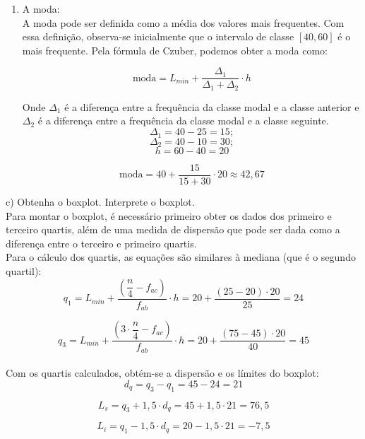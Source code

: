 \begin{enumerate}[i]
    \item A moda:
          \\

          A moda pode ser definida como a média dos valores mais frequentes. Com essa definição, observa-se inicialmente que o intervalo de classe $[40,60]$ é o mais frequente. Pela fórmula de Czuber, podemos obter a moda como:

          \[
              \text{moda} = L_{min} + \frac{\varDelta_1}{\varDelta_1 + \varDelta_2} \cdot h
          \]

          Onde $\varDelta_1$ é a diferença entre a frequência da classe modal e a classe anterior e $\varDelta_2$ é a diferença entre a frequência da classe modal e a classe seguinte.
          \\
          \[\varDelta_1 = 40 - 25 = 15; \]
          \[\varDelta_2 = 40 - 10 = 30; \]
          \[h= 60-40=20 \]

          \begin{equation}
              \text{moda} = 40 + \frac{15}{15+30} \cdot 20 \approx  42,67
          \end{equation}
\end{enumerate}

c) Obtenha o boxplot. Interprete o boxplot.
\\

Para montar o boxplot, é necessário primeiro obter os dados dos primeiro e terceiro quartis, além de uma medida de dispersão que pode ser dada como a diferença entre o terceiro e primeiro quartis.
\\

Para o cálculo dos quartis, as equações são similares à mediana (que é o segundo quartil):
\\

\[
    q_1 = L_{min} + \frac{\left(\dfrac{n}{4}-f_{ac}\right)}{f_{ab}}\cdot h = 20 + \frac{(25-20)\cdot 20}{25} = 24
\]

\[
    q_3 = L_{min} + \frac{\left(3\cdot\dfrac{n}{4}-f_{ac}\right)}{f_{ab}}\cdot h = 20 + \frac{(75-45)\cdot 20}{40} = 45
\]
\\

Com os quartis calculados, obtém-se a dispersão e os límites do boxplot:
\\

\[
    d_q = q_3 - q_1 = 45 - 24 = 21
\]

\[
    L_s = q_3 + 1,5\cdot d_q = 45 +1,5\cdot 21 = 76,5
\]

\[
    L_i = q_1 - 1,5\cdot d_q = 20 - 1,5\cdot 21 = -7,5
\]
\\

